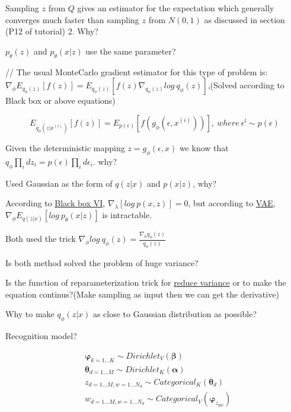 \documentclass{article}
\begin{document}
Sampling $z$ from $Q$ gives an estimator for the expectation which generally converges much faster than sampling $z$ from $N(0,1)$ as discussed in section (P12 of tutorial) 2. Why?


$p_{\theta}(z)$ and $p_{\theta}(x|z)$ use the same parameter? 


// The usual MonteCarlo gradient estimator for this type of problem is: $\nabla_{\phi}E_{q_{\phi}(z)}[f(z)] = E_{q_{\phi}(z)}[f(z)\nabla_{q_{\phi}(z)}log\ q_{\phi}(z)]$,(Solved according to Black box or above equations)

\begin{equation}
E_{q_{\phi}(z|x^{(i)})}[f(z)] = E_{p(\epsilon)}[f(g_{\phi}(\epsilon, x^{(i)}))],\ where\ \epsilon^{l} \sim p(\epsilon)
\end{equation}


Given the deterministic mapping $z = g_{\phi}(\epsilon, x)$ we know that $q_{\phi}\prod_idz_i = p(\epsilon)\prod_id\epsilon_i$. why?


Used Gaussian as the form of $q(z|x)$ and $p(x|z)$, why?


According to \underline{Black box VI}, $\nabla_{\lambda}[log\ p(x,z)] = 0$, but according to \underline{VAE}, $\nabla_{\phi}E_{q(z|x)}[log\ p_{\theta}(x|z)]$ is intractable.


Both used the trick $\nabla_{\phi}log\ q_{\phi}(z) = \frac{\nabla_{\phi}q_{\phi}(z)}{q_{\phi}(z)}$

Is both method solved the problem of huge variance?

Is the function of reparameterization trick for \underline{reduce variance} or to make the equation continus?(Make sampling as input then we can get the derivative)

Why to make $q_\phi(z|x)$ as close to Gaussian distribution as possible?


Recognition model?


\begin{equation}
\begin{split}
&\boldsymbol{\varphi}_{k=1\dots K} \sim Dirichlet_V(\boldsymbol{\beta}) \\
&\boldsymbol{\theta}_{d=1\dots M} \sim Dirichlet_K(\boldsymbol{\alpha})\\
&z_{d=1\dots M, w= 1\dots N_d} \sim Categorical_K(\boldsymbol{\theta}_d)\\
&w_{d=1\dots M, w= 1\dots N_d} \sim Categorical_V(\boldsymbol{\varphi}_{z_{dw}})\\
\end{split}
\end{equation}
\end{document}
